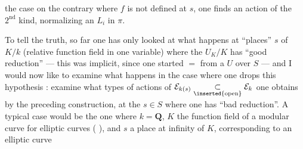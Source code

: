 the case on the contrary where  $f$ is not defined at $s$, one finds an  action of the $2^{\text{nd}}$ kind, normalizing an $L_i$  in $\pi$.

To tell the truth, so far one has only looked at what happens at ``places'' $s$ of $K/k$ (relative function field in one variable) where the   $U_K/K$ has ``good reduction'' --- this was implicit, since one started $=$ from a $U$ over $S$ --- and I would now like to examine what happens in the case where one drops this hypothesis : examine what types of actions of $\mathcal E_{k(s)}\underset{\inserted{\text{open}}}{\subset}\mathcal E_k$ one obtains by the preceding construction, at the $s\in S$ where one has ``bad reduction''. A typical case would be the one where $k=\mathbf Q$, $K$ the function field of a modular curve for elliptic curves ( ), and $s$ a place at infinity of $K$, corresponding to an elliptic curve
